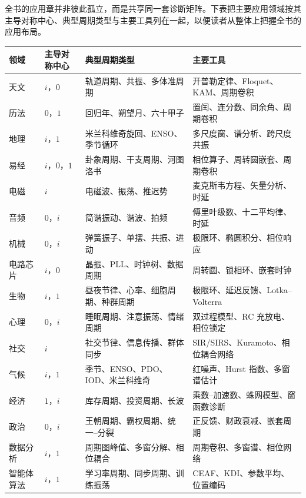 全书的应用章并非彼此孤立，而是共享同一套诊断矩阵。下表把主要应用领域按其主导对称中心、典型周期类型与主要工具列在一起，以便读者从整体上把握全书的应用布局。

\begin{center}
\renewcommand{\arraystretch}{1.25}
\small
\begin{tabular}{@{}p{2.2cm}p{2.5cm}p{3.2cm}p{4.8cm}@{}}
\toprule
\textbf{领域} & \textbf{主导对称中心} & \textbf{典型周期类型} & \textbf{主要工具} \\
\midrule
天文 & $i$，$0$ & 轨道周期、共振、多体准周期 & 开普勒定律、Floquet、KAM、周期卷积 \\
历法 & $0$，$1$ & 回归年、朔望月、六十甲子 & 置闰、连分数、同余角、周期卷积 \\
地理 & $i$，$1$ & 米兰科维奇旋回、ENSO、季节循环 & 多尺度窗、谱分析、跨尺度共振 \\
易经 & $i$，$0$，$1$ & 卦象周期、干支周期、河图洛书 & 相位算子、周转圆嵌套、周期卷积 \\
电磁 & $i$ & 电磁波、振荡、推迟势 & 麦克斯韦方程、矢量分析、时延 \\
音频 & $0$，$i$ & 简谐振动、谐波、拍频 & 傅里叶级数、十二平均律、时延 \\
机械 & $0$，$i$ & 弹簧振子、单摆、共振、进动 & 极限环、椭圆积分、相位响应 \\
电路芯片 & $i$，$0$ & 晶振、PLL、时钟树、数据周期 & 周转圆、锁相环、嵌套时钟 \\
生物 & $i$，$1$ & 昼夜节律、心率、细胞周期、种群周期 & 极限环、延迟反馈、Lotka--Volterra \\
心理 & $0$，$i$ & 睡眠周期、注意振荡、情绪周期 & 双过程模型、RC 充放电、相位锁定 \\
社交 & $i$ & 社交节律、信息传播、群体同步 & SIR/SIRS、Kuramoto、相位耦合网络 \\
气候 & $i$，$1$ & 季节、ENSO、PDO、IOD、米兰科维奇 & 红噪声、Hurst 指数、多窗谱估计 \\
经济 & $1$，$i$ & 库存周期、投资周期、长波 & 乘数--加速数、蛛网模型、窗函数诊断 \\
政治 & $0$，$i$ & 王朝周期、霸权周期、统一--分裂 & 正反馈、财政衰减、嵌套周期 \\
数据分析 & $i$，$1$ & 周期图峰值、多窗分解、相位耦合 & 周期卷积、多窗谱、相位网络 \\
智能体算法 & $i$，$1$ & 学习率周期、同步周期、训练振荡 & CEAF、KDI、参数平均、位置编码 \\
\bottomrule
\end{tabular}
\end{center}

